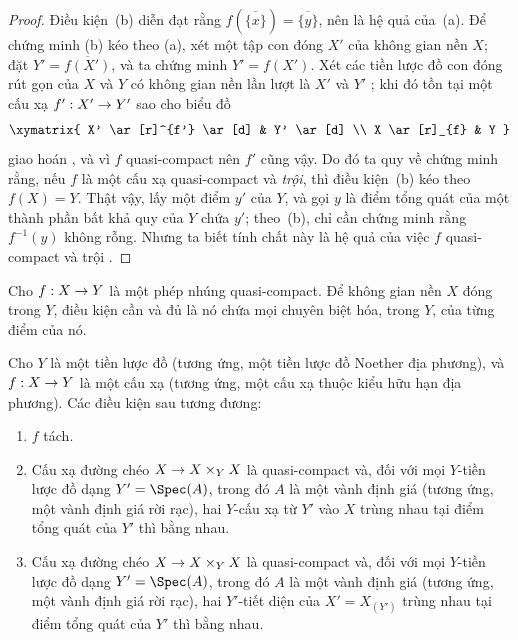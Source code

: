\documentclass[oneside,10pt]{amsart}
\makeatletter
\newcommand{\ega@arrow}[2]{\mathchoice{#1}{#2}{#2}{#2}}
\renewcommand{\to}{\ega@arrow{\longrightarrow}{\rightarrow}}
\newcommand{\oldpage}[2][]{\marginnote{\normalfont\footnotesize\textbf{#1}~|~#2}\ignorespaces}
\let\EGAOriginalLabel\label
\renewcommand{\label}[1]{\phantomsection\EGAOriginalLabel{#1}}
\makeatother
\begin{document}
\begin{proof}
Điều kiện~(b) diễn đạt rằng $f(\overline{\{x\}})=\overline{\{y\}}$, nên là hệ quả của~(a).
Để chứng minh (b) kéo theo (a), xét một tập con đóng $X'$ của không gian nền $X$;
đặt $Y'=\overline{f(X')}$, và ta chứng minh $Y'=f(X')$.
Xét các tiền lược đồ con đóng rút gọn của $X$ và $Y$ có không gian nền lần lượt là $X'$ và $Y'$ ;
khi đó tồn tại một cấu xạ $f':X'\to Y'$ sao cho biểu đồ
\[
    \xymatrix{
        X' \ar[r]^{f'} \ar[d]
        & Y' \ar[d]
    \\  X \ar[r]_{f}
        & Y
    }
\]
giao hoán , và vì $f$ quasi-compact nên $f'$ cũng vậy.
Do đó ta quy về chứng minh rằng, nếu $f$ là một cấu xạ quasi-compact và \emph{trội}, thì
\oldpage[II]{142}
điều kiện~(b) kéo theo $f(X)=Y$.
Thật vậy, lấy một điểm $y'$ của $Y$, và gọi $y$ là điểm tổng quát của một thành phần bất khả quy của $Y$ chứa $y'$;
theo~(b), chỉ cần chứng minh rằng $f^{-1}(y)$ không rỗng.
Nhưng ta biết tính chất này là hệ quả của việc $f$ quasi-compact và trội .
\end{proof}

\begin{corollary}[7.2.2]
\label{II.7.2.2}
Cho $f:X\to Y$ là một phép nhúng quasi-compact.
Để không gian nền $X$ đóng trong $Y$, điều kiện cần và đủ là nó chứa mọi chuyên biệt hóa, trong $Y$, của từng điểm của nó.
\end{corollary}

\begin{proposition}[7.2.3]
\label{II.7.2.3}
Cho $Y$ là một tiền lược đồ (tương ứng, một tiền lược đồ Noether địa phương), và $f:X\to Y$ là một cấu xạ (tương ứng, một cấu xạ thuộc kiểu hữu hạn địa phương).
Các điều kiện sau tương đương:
\begin{enumerate}
    \item[\rm{(a)}] $f$ tách.
    \item[\rm{(b)}] Cấu xạ đường chéo $X\to X\times_Y X$ là quasi-compact và, đối với mọi $Y$-tiền lược đồ dạng $Y'=\Spec(A)$, trong đó $A$ là một vành định giá (tương ứng, một vành định giá rời rạc), hai $Y$-cấu xạ từ $Y'$ vào $X$ trùng nhau tại điểm tổng quát của $Y'$ thì bằng nhau.
    \item[\rm{(c)}] Cấu xạ đường chéo $X\to X\times_Y X$ là quasi-compact và, đối với mọi $Y$-tiền lược đồ dạng $Y'=\Spec(A)$, trong đó $A$ là một vành định giá (tương ứng, một vành định giá rời rạc), hai $Y'$-tiết diện của $X'=X_{(Y')}$ trùng nhau tại điểm tổng quát của $Y'$ thì bằng nhau.
\end{enumerate}
\end{proposition}
\end{document}
